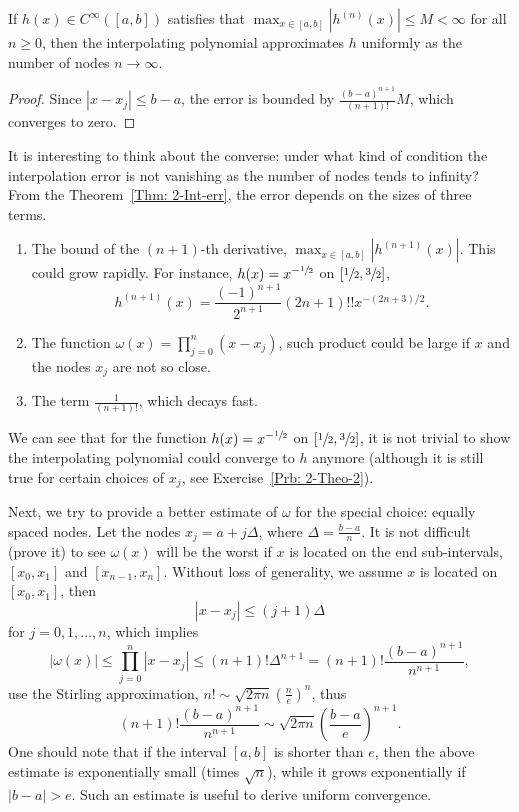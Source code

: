 \begin{corollary}
    If $h(x)\in C^{\infty}([a, b])$ satisfies that $\max_{x\in[a,b]} |h^{(n)}(x)|\le M <\infty$ for all $n\ge 0$, then the interpolating polynomial approximates $h$ uniformly as the number of nodes $n\to \infty$.
\end{corollary}
\begin{proof}
    Since $|x -x_j|\le b-a$, the error is bounded by $\frac{(b-a)^{n+1}}{(n+1)!} M$, which converges to zero.
\end{proof}
It is interesting to think about the converse: under what kind of condition the interpolation error is not vanishing as the number of nodes tends to infinity? From the Theorem~\ref{Thm: 2-Int-err}, the error depends on the sizes of three terms. 
\begin{enumerate}
    \item The bound of the $(n+1)$-th derivative, $\max_{x\in[a,b]}|h^{(n+1)}(x)|$. This could grow rapidly. For instance, $h(x) = x^{-\sfrac{1}{2}}$ on $[\sfrac{1}{2}, \sfrac{3}{2}]$,
    \begin{equation}
         h^{(n+1)}(x) = \frac{(-1)^{n+1}}{2^{n+1}} (2n+1)!! x^{-(2n+3)/2}.
    \end{equation}
    \item The function $\omega(x) = \prod_{j=0}^n (x - x_j)$, such product could be large if $x$ and the nodes $x_j$ are not so close.
    \item The term $\frac{1}{(n+1)!}$, which decays fast.
\end{enumerate}
We can see that for the function $h(x) = x^{-\sfrac{1}{2}}$ on $[\sfrac{1}{2}, \sfrac{3}{2}]$, it is not trivial to show the interpolating polynomial could converge to $h$ anymore (although it is still true for certain choices of $x_j$, see Exercise~\ref{Prb: 2-Theo-2}). 

Next, we try to provide a better estimate of $\omega$ for the special choice: equally spaced nodes.  Let the nodes $x_j = a + j\Delta$, where $\Delta = \frac{b-a}{n}$. It is not difficult (prove it) to see $\omega(x)$ will be the worst if $x$ is located on the end sub-intervals, $[x_0, x_1]$ and $[x_{n-1}, x_n]$. Without loss of generality, we assume $x$ is located on $[x_0, x_1]$, then 
$$|x - x_j|\le (j+1)\Delta$$
for $j = 0, 1, \dots, n$, which implies 
\begin{equation}
    |\omega(x)|\le \prod_{j=0}^n |x - x_j|\le (n+1)! \Delta^{n+1} = (n+1)! \frac{(b-a)^{n+1}}{n^{n+1}},
\end{equation}
use the Stirling approximation, $n!\sim \sqrt{2\pi n} \left( \frac{n}{e}\right)^n $, thus 
$$  (n+1)! \frac{(b-a)^{n+1}}{n^{n+1}} \sim \sqrt{2\pi n} \left(\frac{b-a}{e} \right)^{n+1}.$$
One should note that if the interval $[a, b]$ is shorter than $e$, then the above estimate is exponentially small (times $\sqrt{n}$), while it grows exponentially if $|b-a| > e$. Such an estimate is useful to derive uniform convergence. 


